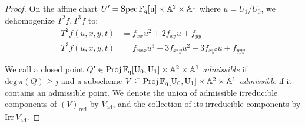 \documentclass[12pt]{article}
\theoremstyle{plain}
\theoremstyle{definition}
\newcommand{\IA}{\mathbb{A}}
\newcommand{\IF}{\mathbb{F}}
\renewcommand{\deg}{\mathrm{deg}\,}
\newcommand{\Spec}{\rm Spec\,}
\newcommand{\Proj}{\rm Proj\,}
\newcommand{\<}{\langle}
\renewcommand{\>}{\rangle}
\newcommand{\ad}{\mathrm{ad}}
\newcommand{\Irr}{\mathrm{Irr}}
\begin{document}
\begin{proof}
On the affine chart $U' = \Spec \IF_q[u] \times \IA^2 \times \IA^1$ where $u = U_1/U_0$, we dehomogenize $T^2 f, T^3 f$ to:
\begin{align*}
T^2 f(u, x, y, t) &= f_{xx} u^2 + 2 f_{xy} u + f_{yy} \\
T^3 f(u, x, y, t) &= f_{xxx} u^3 + 3 f_{x^2 y} u^2 + 3 f_{xy^2}u + f_{yyy} 
\end{align*}

We call a closed point $Q' \in \Proj \IF_q[U_0, U_1] \times \IA^2 \times \IA^1$ \textit{admissible} if $\deg \pi(Q) \ge j$ and a subscheme $V \subseteq  \Proj \IF_q[U_0, U_1] \times \IA^2 \times \IA^1$ \textit{admissible} if it contains an admissible point. We denote the union of admissible irreducible components of $(V)_{\mathrm{red}}$ by $V_{\ad}$, and the collection of its irreducible components by $\Irr \, V_{\ad}$.



\end{proof}
\end{document}
